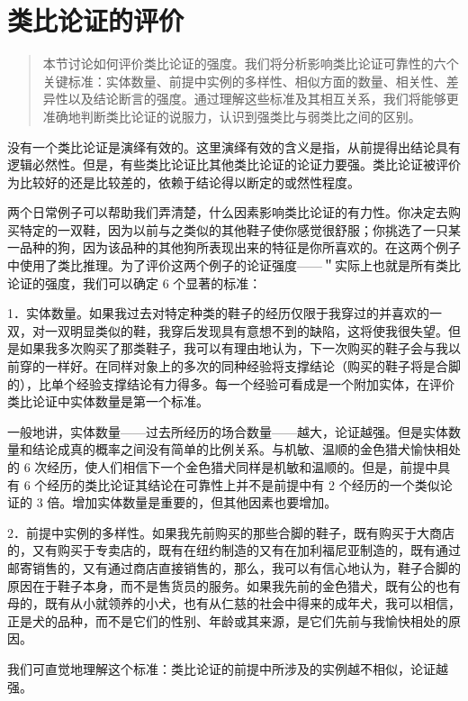 \section{类比论证的评价}

\begin{quotation}
本节讨论如何评价类比论证的强度。我们将分析影响类比论证可靠性的六个关键标准：实体数量、前提中实例的多样性、相似方面的数量、相关性、差异性以及结论断言的强度。通过理解这些标准及其相互关系，我们将能够更准确地判断类比论证的说服力，认识到强类比与弱类比之间的区别。
\end{quotation}

没有一个类比论证是演绎有效的。这里演绎有效的含义是指，从前提得出结论具有逻辑必然性。但是，有些类比论证比其他类比论证的论证力要强。类比论证被评价为比较好的还是比较差的，依赖于结论得以断定的或然性程度。

两个日常例子可以帮助我们弄清楚，什么因素影响类比论证的有力性。你决定去购买特定的一双鞋，因为以前与之类似的其他鞋子使你感觉很舒服；你挑选了一只某一品种的狗，因为该品种的其他狗所表现出来的特征是你所喜欢的。在这两个例子中使用了类比推理。为了评价这两个例子的论证强度——＂实际上也就是所有类比论证的强度，我们可以确定 6 个显著的标准：

1．实体数量。如果我过去对特定种类的鞋子的经历仅限于我穿过的并喜欢的一双，对一双明显类似的鞋，我穿后发现具有意想不到的缺陷，这将使我很失望。但是如果我多次购买了那类鞋子，我可以有理由地认为，下一次购买的鞋子会与我以前穿的一样好。在同样对象上的多次的同种经验将支撑结论（购买的鞋子将是合脚的），比单个经验支撑结论有力得多。每一个经验可看成是一个附加实体，在评价类比论证中实体数量是第一个标准。

一般地讲，实体数量——过去所经历的场合数量——越大，论证越强。但是实体数量和结论成真的概率之间没有简单的比例关系。与机敏、温顺的金色猎犬愉快相处的 6 次经历，使人们相信下一个金色猎犬同样是机敏和温顺的。但是，前提中具有 6 个经历的类比论证其结论在可靠性上并不是前提中有 2 个经历的一个类似论证的 3 倍。增加实体数量是重要的，但其他因素也要增加。

2．前提中实例的多样性。如果我先前购买的那些合脚的鞋子，既有购买于大商店的，又有购买于专卖店的，既有在纽约制造的又有在加利福尼亚制造的，既有通过邮寄销售的，又有通过商店直接销售的，那么，我可以有信心地认为，鞋子合脚的原因在于鞋子本身，而不是售货员的服务。如果我先前的金色猎犬，既有公的也有母的，既有从小就领养的小犬，也有从仁慈的社会中得来的成年犬，我可以相信，正是犬的品种，而不是它们的性别、年龄或其来源，是它们先前与我愉快相处的原因。

我们可直觉地理解这个标准：类比论证的前提中所涉及的实例越不相似，论证越强。

